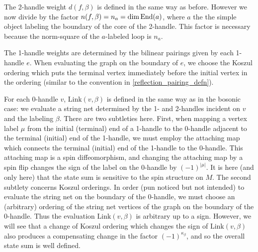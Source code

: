 The 2-handle weight $d(f, \beta)$ is defined in the same way as before. 
However we now divide by the factor $n(f, \beta) = n_a = \dim\text{End}(a)$,
where $a$ the the simple object labeling the boundary of the core of the 2-handle.
This factor is necessary because the norm-square of the $a$-labeled loop is $n_a$.

The 1-handle weights are determined by the bilinear pairings given by each 1-handle $e$. 
When evaluating the graph on the boundary of $e$, we choose the Koszul ordering which puts the terminal vertex
immediately before the initial vertex in the ordering (similar to the convention in \eqref{reflection_pairing_defn}).

For each 0-handle $v$, $\text{Link}(v,\beta)$ is defined in the same way as in the bosonic case:
we evaluate a string net determined by the 1- and 2-handles incident on $v$ and the labeling $\beta$.
There are two subtleties here.
First, when mapping a vertex label $\mu$ from the initial (terminal) end of a 1-handle to the 0-handle adjacent to the terminal (initial) end of the 1-handle, 
we must employ the attaching map which connects the terminal (initial) end of the 1-handle to the 0-handle.
This attaching map is a spin diffeomorphism, 
and changing the attaching map by a spin flip changes the sign
of the label on the 0-handle by $(-1)^{|\mu|}$.
It is here (and only here) that the state sum is sensitive to the spin structure on $M$.
The second subtlety concerns Koszul orderings.
In order (pun noticed but not intended)
to evaluate the string net on the boundary of the 0-handle, we must choose an (arbitrary) ordering
of the string net vertices of the graph on the boundary of the 0-handle.
Thus the evaluation $\text{Link}(v, \beta)$ is arbitrary up to a sign.
However, we will see that a change of Koszul ordering which changes the sign of $\text{Link}(v, \beta)$ also produces a compensating
change in the factor $(-1)^{\kappa_\beta}$, and so the overall state sum is well defined.

